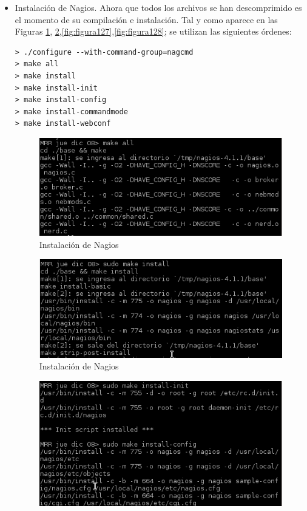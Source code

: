 \begin{itemize}
	\item Instalación de Nagios.
	Ahora que todos los archivos se han descomprimido es el momento de su compilación e instalación. Tal y como aparece en las Figuras \ref{fig:figura125}, \ref{fig:figura126},\ref{fig:figura127},\ref{fig:figura128}; se utilizan las siguientes órdenes:
\begin{lstlisting}[style=fich]
> ./configure --with-command-group=nagcmd
> make all
> make install
> make install-init
> make install-config
> make install-commandmode
> make install-webconf
\end{lstlisting}

	\begin{figure}[H]
		\centering
		\includegraphics[scale=1]{figuras/ejercicio12/figura7.png} 
		\caption{Instalación de Nagios} 
		\label{fig:figura125}
	\end{figure}
	\begin{figure}[H]
		\centering
		\includegraphics[scale=0.94]{figuras/ejercicio12/figura8.png} 
		\caption{Instalación de Nagios} 
		\label{fig:figura126}
	\end{figure}
	\begin{figure}[H]
		\centering
		\includegraphics[scale=0.94]{figuras/ejercicio12/figura9.png} 

\end{figure}
\end{itemize}
